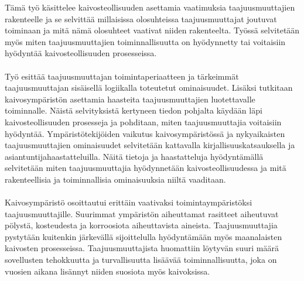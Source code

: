 \documentclass[finnish,12pt,a4paper,pdftex,elec,utf8]{aaltothesis}
\begin{document}
\begin{abstractpage}[finnish]
Tämä työ käsittelee kaivosteollisuuden asettamia vaatimuksia taajuusmuuttajien rakenteelle ja se selvittää millaisissa olosuhteissa taajuusmuuttajat joutuvat toiminaan ja mitä nämä olosuhteet vaativat niiden rakenteelta. Työssä selvitetään myös miten taajuusmuuttajien toiminnallisuutta on hyödynnetty tai voitaisiin hyödyntää kaivosteollisuuden prosesseissa.
\\\\
Työ esittää taajuusmuuttajan toimintaperiaatteen ja tärkeimmät taajuusmuuttajan sisäisellä logiikalla toteutetut ominaisuudet. Lisäksi tutkitaan kaivosympäristön asettamia haasteita taajuusmuuttajien luotettavalle toiminnalle. Näistä selvityksistä kertyneen tiedon pohjalta käydään läpi kaivosteollisuuden prosesseja ja pohditaan, miten taajuusmuuttajia voitaisiin hyödyntää. Ympäristötekijöiden vaikutus kaivosympäristössä ja nykyaikaisten taajuusmuuttajien ominaisuudet selvitetään kattavalla kirjallisuuskatsauksella ja asiantuntijahaastatteluilla. Näitä tietoja ja haastatteluja hyödyntämällä selvitetään miten taajuusmuuttajia hyödynnetään kaivosteollisuudessa ja mitä rakenteellisia ja toiminnallisia ominaisuuksia niiltä vaaditaan.
\\\\
Kaivosympäristö osoittautui erittäin vaativaksi toimintaympäristöksi taajuusmuuttajille. Suurimmat ympäristön aiheuttamat rasitteet aiheutuvat pölystä, kosteudesta ja korroosiota aiheuttavista aineista. Taajuusmuuttajia pystytään kuitenkin järkevällä sijoittelulla hyödyntämään myös maanalaisten kaivosten prosesseissa. Taajuusmuuttajista huomattiin löytyvän suuri määrä sovellusten tehokkuutta ja turvallisuutta lisäävää toiminnallisuutta, joka on vuosien aikana lisännyt niiden suosiota myös kaivoksissa.

\end{abstractpage}

\newpage

\thesistableofcontents


\end{document}
